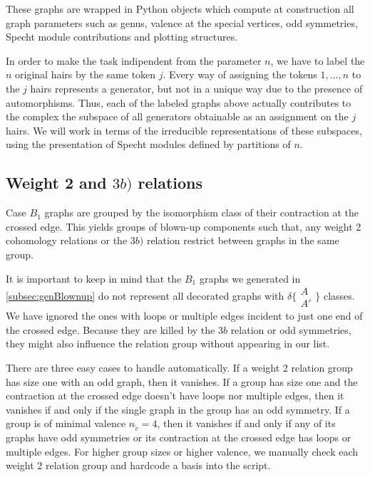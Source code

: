 These graphs are wrapped in Python objects which compute at construction all graph parameters such as genus, valence at the special vertices, odd symmetries, Specht module contributions and plotting structures.

In order to make the task indipendent from the parameter $n$, we have to label the $n$ original hairs by the same token $j$. Every way of assigning the tokens $1,...,n$ to the $j$ hairs represents a generator, but not in a unique way due to the presence of automorphisms. Thus, each of the labeled graphs above actually contributes to the complex the subspace of all generators obtainable as an assignment on the $j$ hairs. We will work in terms of the irreducible representations of these subspaces, using the presentation of Specht modules defined by partitions of $n$.

\subsection{Weight 2 and $3b)$ relations} Case $B_1$ graphs are grouped by the isomorphism class of their contraction at the crossed edge.
This yields groups of blown-up components such that, any weight 2 cohomology relations or the $3b)$ relation restrict between graphs in the same group.

It is important to keep in mind that the $B_1$ graphs we generated in \ref{subsec:genBlownup} do not represent all decorated graphs with $\delta\{\substack{A\\A'}\}$ classes. We have ignored the ones with loops or multiple edges incident to just one end of the crossed edge. Because they are killed by the $3b$ relation or odd symmetries, they might also influence the relation group without appearing in our list.

There are three easy cases to handle automatically. If a weight 2 relation group has size one with an odd graph, then it vanishes. If a group has size one and the contraction at the crossed edge doesn't have loops nor multiple edges, then it vanishes if and only if the single graph in the group has an odd symmetry. If a group is of minimal valence $n_{\tilde{v}}=4$, then it vanishes if and only if any of its graphs have odd symmetries or its contraction at the crossed edge has loops or multiple edges. For higher group sizes or higher valence, we manually check each weight 2 relation group and hardcode a basis into the script.

